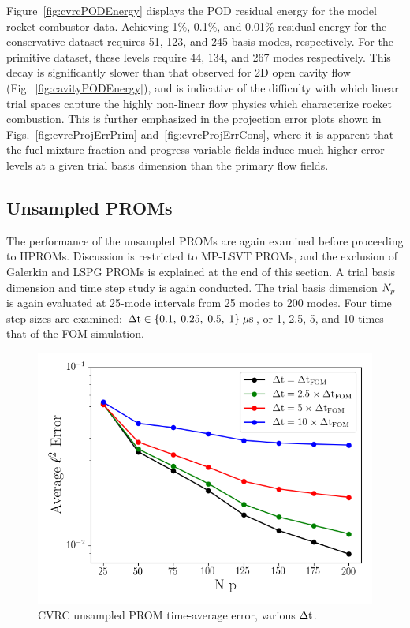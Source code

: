 Figure~\ref{fig:cvrcPODEnergy} displays the POD residual energy for the model rocket combustor data. Achieving 1\%, 0.1\%, and 0.01\% residual energy for the conservative dataset requires 51, 123, and 245 basis modes, respectively. For the primitive dataset, these levels require 44, 134, and 267 modes respectively. This decay is significantly slower than that observed for 2D open cavity flow (Fig.~\ref{fig:cavityPODEnergy}), and is indicative of the difficulty with which linear trial spaces capture the highly non-linear flow physics which characterize rocket combustion. This is further emphasized in the projection error plots shown in Figs.~\ref{fig:cvrcProjErrPrim} and~\ref{fig:cvrcProjErrCons}, where it is apparent that the fuel mixture fraction and progress variable fields induce much higher error levels at a given trial basis dimension than the primary flow fields.

\subsection{Unsampled PROMs}

The performance of the unsampled PROMs are again examined before proceeding to HPROMs. Discussion is restricted to MP-LSVT PROMs, and the exclusion of Galerkin and LSPG PROMs is explained at the end of this section. A trial basis dimension and time step study is again conducted. The trial basis dimension $N_p$ is again evaluated at 25-mode intervals from 25 modes to 200 modes. Four time step sizes are examined: $\Delta \text{t} \in \{ 0.1, \; 0.25, \; 0.5, \; 1 \} \; \mu \text{s}$, or 1, 2.5, 5, and 10 times that of the FOM simulation.

\begin{figure}
	\centering
	\includegraphics[width=0.7\linewidth]{Chapters/HPROMResults/Images/cvrc/unsampled/unsampled_avg_mode_Average_errorRaw.png}
	\caption{\label{fig:cvrcUnsampledROMErrVsModes}CVRC unsampled PROM time-average error, various $\Delta \text{t}$.}
\end{figure}

